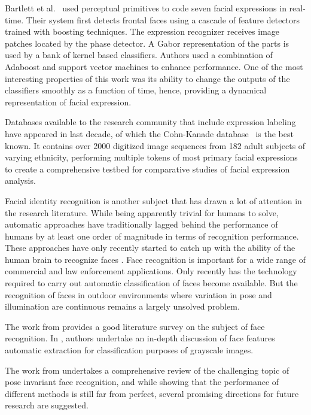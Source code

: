 \documentclass[]{article}
\begin{document}
Bartlett et al.~\cite{Bartlett4624313} used perceptual primitives to code seven facial expressions in real-time. Their system
first detects frontal faces using a cascade of feature detectors trained with boosting techniques. The expression
recognizer receives image patches located by the phase detector. A Gabor representation of the parts is used  by a bank
of kernel based classifiers. Authors used a combination of Adaboost and support vector machines to enhance performance.
One of the most interesting properties of this work was its ability to change the outputs of the classifiers smoothly
as a function of time, hence, providing a dynamical representation of facial expression.

Databases available to the research community that include expression
labeling have appeared in last decade, of which the Cohn-Kanade
database~\cite{Cohn840611} is the best known. It contains over 2000
digitized image sequences from  182 adult subjects of varying
ethnicity, performing multiple tokens of most primary facial
expressions to create a comprehensive testbed for
comparative studies of facial expression analysis.


Facial identity recognition is another subject that has drawn a lot of attention in the research literature. While being
apparently trivial for humans to solve, automatic approaches have traditionally lagged behind the performance of humans
by at least one order of magnitude in terms of recognition performance. These approaches have only recently started to
catch up with the ability of the human brain to recognize faces \cite{onintelligence, Rozado2012b}. Face recognition is
important  for a wide range of commercial and law enforcement applications. Only recently has the technology required to
carry out automatic classification of faces become available. But the recognition of faces in outdoor environments 
where variation in pose and illumination are continuous remains a largely unsolved problem.

The work from \cite{Zhao:2003} provides a good literature survey on the subject of face recognition. In
\cite{Craw1987183}, authors undertake an in-depth discussion of face features automatic extraction for classification purposes of
grayscale images.

The work from \cite{Zhang20092876} undertakes a comprehensive review  of the challenging topic of pose invariant face
recognition, and while showing that the performance of different methods is still far from perfect, several promising
directions for future research  are suggested.
\end{document}
